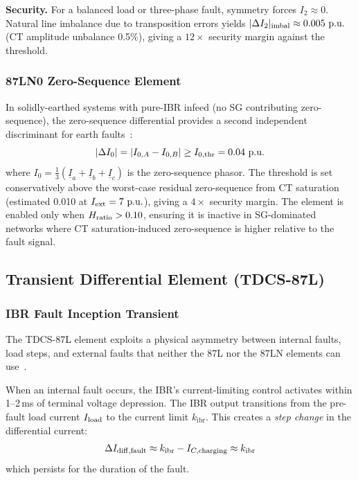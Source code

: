 \documentclass[journal,twoside,10pt]{IEEEtran}
\newcommand{\kibr}{k_{\mathrm{ibr}}}
\newcommand{\pu}{\,\text{p.u.}}
\begin{document}
\textbf{Security.}  For a balanced load or three-phase fault, symmetry
forces $I_2 \approx 0$.  Natural line imbalance due to transposition errors
yields $|\Delta I_2|_{\rm imbal} \approx 0.005\,\pu$ (CT amplitude unbalance
0.5\%), giving a $12\times$ security margin against the threshold.

\subsubsection{87LN0 Zero-Sequence Element}

In solidly-earthed systems with pure-IBR infeed (no SG contributing
zero-sequence), the zero-sequence differential provides a second independent
discriminant for earth faults~\cite{SAMBP_TR22}:
\begin{equation}
  |\Delta I_0| = |{I}_{0,A} - {I}_{0,B}| \geq I_{0,\rm thr} = 0.04\,\pu
  \label{eq:87LN0}
\end{equation}
where $I_0 = \tfrac{1}{3}(\underline{I}_a + \underline{I}_b +
\underline{I}_c)$ is the zero-sequence phasor.
The threshold is set conservatively above the worst-case residual zero-sequence
from CT saturation (estimated 0.010\,\pu at $I_{\rm ext} = 7\,\pu$),
giving a $4\times$ security margin.
The element is enabled only when $H_{\rm ratio} > 0.10$, ensuring it is
inactive in SG-dominated networks where CT saturation-induced zero-sequence
is higher relative to the fault signal.

\subsection{Transient Differential Element (TDCS-87L)}
\label{sec:tdcs}

\subsubsection{IBR Fault Inception Transient}

The TDCS-87L element exploits a physical asymmetry between internal faults,
load steps, and external faults that neither the 87L nor the 87LN elements
can use~\cite{SAMBP_TR23}.

When an internal fault occurs, the IBR's current-limiting control activates
within 1--2\,ms of terminal voltage depression.  The IBR output transitions
from the pre-fault load current $I_{\rm load}$ to the current limit $\kibr$.
This creates a \emph{step change} in the differential current:
\begin{equation}
  \Delta I_{\rm diff,fault} \approx \kibr - I_{C,\rm charging} \approx \kibr
  \label{eq:tdcs_step}
\end{equation}
which persists for the duration of the fault.
\end{document}
